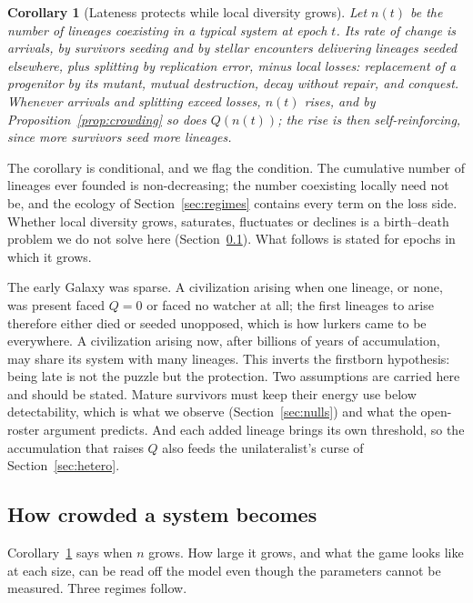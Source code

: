 \documentclass[preprint,12pt]{elsarticle}
\newtheorem{corollary}{Corollary}
\theoremstyle{definition}
\begin{document}
\begin{corollary}[Lateness protects while local diversity grows]
\label{cor:epoch}
Let $n(t)$ be the number of lineages coexisting in a typical system at epoch $t$. Its rate of change is arrivals, by survivors seeding and by stellar encounters delivering lineages seeded elsewhere, plus splitting by replication error, minus local losses: replacement of a progenitor by its mutant, mutual destruction, decay without repair, and conquest. Whenever arrivals and splitting exceed losses, $n(t)$ rises, and by Proposition~\ref{prop:crowding} so does $Q(n(t))$; the rise is then self-reinforcing, since more survivors seed more lineages.
\end{corollary}

The corollary is conditional, and we flag the condition. The cumulative number of lineages ever founded is non-decreasing; the number coexisting locally need not be, and the ecology of Section~\ref{sec:regimes} contains every term on the loss side. Whether local diversity grows, saturates, fluctuates or declines is a birth--death problem we do not solve here (Section~\ref{sec:crowding}). What follows is stated for epochs in which it grows.

The early Galaxy was sparse. A civilization arising when one lineage, or none, was present faced $Q = 0$ or faced no watcher at all; the first lineages to arise therefore either died or seeded unopposed, which is how lurkers came to be everywhere. A civilization arising now, after billions of years of accumulation, may share its system with many lineages. This inverts the firstborn hypothesis: being late is not the puzzle but the protection. Two assumptions are carried here and should be stated. Mature survivors must keep their energy use below detectability, which is what we observe (Section~\ref{sec:nulls}) and what the open-roster argument predicts. And each added lineage brings its own threshold, so the accumulation that raises $Q$ also feeds the unilateralist's curse of Section~\ref{sec:hetero}.

\subsection{How crowded a system becomes}
\label{sec:crowding}

Corollary~\ref{cor:epoch} says when $n$ grows. How large it grows, and what the game looks like at each size, can be read off the model even though the parameters cannot be measured. Three regimes follow.
\end{document}

